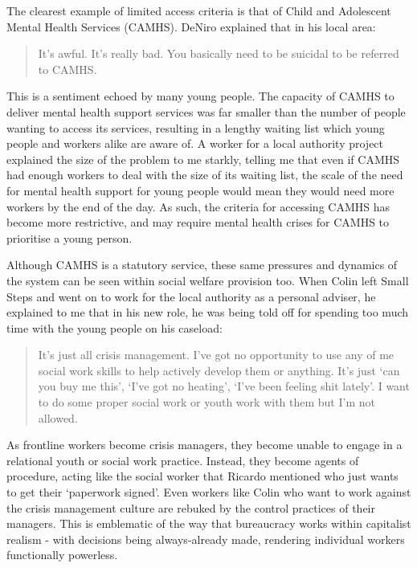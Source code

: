 The clearest example of limited access criteria is that of Child and Adolescent Mental Health Services (CAMHS). DeNiro explained that in his local area:
\begin{quote}
It's awful. It's really bad. You basically need to be suicidal to be referred to CAMHS.
\end{quote}
This is a sentiment echoed by many young people. The capacity of CAMHS to deliver mental health support services was far smaller than the number of people wanting to access its services, resulting in a lengthy waiting list which young people and workers alike are aware of. A worker for a local authority project explained the size of the problem to me starkly, telling me that even if CAMHS had enough workers to deal with the size of its waiting list, the scale of the need for mental health support for young people would mean they would need more workers by the end of the day. As such, the criteria for accessing CAMHS has become more restrictive, and may require mental health crises for CAMHS to prioritise a young person. 

Although CAMHS is a statutory service, these same pressures and dynamics of the system can be seen within social welfare provision too. When Colin left Small Steps and went on to work for the local authority as a personal adviser, he explained to me that in his new role, he was being told off for spending too much time with the young people on his caseload:
\begin{quote}
It's just all crisis management. I've got no opportunity to use any of me social work skills to help actively develop them or anything. It's just `can you buy me this', `I've got no heating', `I've been feeling shit lately'. I want to do some proper social work or youth work with them but I'm not allowed.
\end{quote}
As frontline workers become crisis managers, they become unable to engage in a relational youth or social work practice. Instead, they become agents of procedure, acting like the social worker that Ricardo mentioned who just wants to get their `paperwork signed'. Even workers like Colin who want to work against the crisis management culture are rebuked by the control practices of their managers. This is emblematic of the way that bureaucracy works within capitalist realism - with decisions being always-already made, rendering individual workers functionally powerless.

